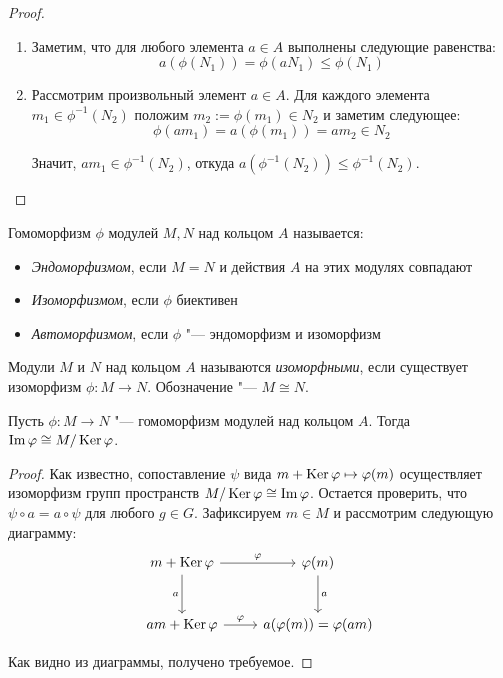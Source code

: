\begin{proof}~
	\begin{enumerate}
		\item Заметим, что для любого элемента $a \in A$ выполнены следующие равенства:
		\[a(\phi(N_1)) = \phi(aN_1) \le \phi(N_1)\]
		\item Рассмотрим произвольный элемент $a \in A$. Для каждого элемента $m_1 \in \phi^{-1}(N_2)$ положим $m_2 := \phi(m_1) \in N_2$ и заметим следующее:
		\[\phi(am_1) = a(\phi(m_1)) = am_2 \in N_2\]
		
		Значит, $am_1 \in \phi^{-1}(N_2)$, откуда $a(\phi^{-1}(N_2)) \le \phi^{-1}(N_2)$.\qedhere
	\end{enumerate}
\end{proof}

\begin{definition}
	Гомоморфизм $\phi$ модулей $M, N$ над кольцом $A$ называется:
	\begin{itemize}
		\item \textit{Эндоморфизмом}, если $M = N$ и действия $A$ на этих модулях совпадают
		\item \textit{Изоморфизмом}, если $\phi$ биективен
		\item \textit{Автоморфизмом}, если $\phi$ "--- эндоморфизм и изоморфизм
	\end{itemize}
\end{definition}

\begin{definition}
	Модули $M$ и $N$ над кольцом $A$ называются \textit{изоморфными}, если существует изоморфизм $\phi : M \to N$. Обозначение "--- $M \cong N$.
\end{definition}

\begin{theorem}
	Пусть $\phi: M \to N$ "--- гомоморфизм модулей над кольцом $A$. Тогда $\operatorname{Im}\varphi \cong M / \operatorname{Ker}\varphi$.
\end{theorem}

\begin{proof}
	Как известно, сопоставление $\psi$ вида $m + \operatorname{Ker}\varphi \mapsto \varphi(m)$ осуществляет изоморфизм групп пространств $M / \operatorname{Ker}\varphi \cong \operatorname{Im}\varphi$. Остается проверить, что $\psi \circ a = a \circ \psi$ для любого $g \in G$. Зафиксируем $m \in M$ и рассмотрим следующую диаграмму:
	\[
	\begin{tikzcd}[row sep = large]
		m + \ke\phi \arrow[swap]{d}{a} \arrow{r}{\phi} & \phi(m) \arrow{d}{a}\\
		am + \ke\phi \arrow{r}{\phi} & a(\phi(m)) = \phi(am)
	\end{tikzcd}
	\]
	
	Как видно из диаграммы, получено требуемое.
\end{proof}

